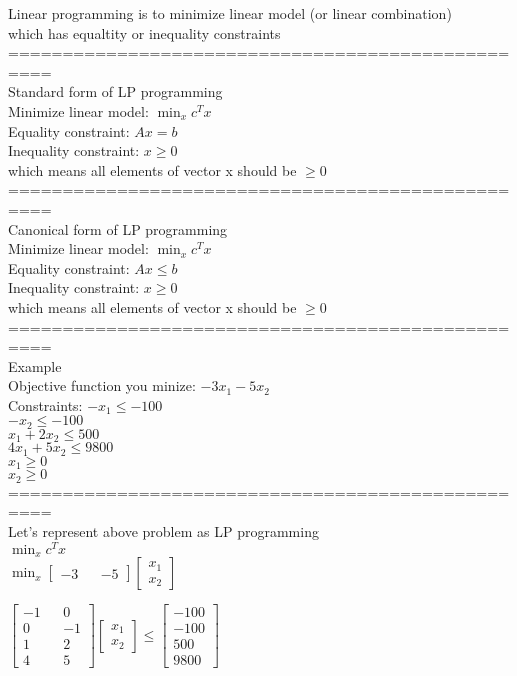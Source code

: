 \documentclass{article}
\begin{document}
Linear programming is to minimize linear model (or linear combination) \\
which has equaltity or inequality constraints \\

==================================================\\
Standard form of LP programming \\ 
Minimize linear model: $\min_x c^Tx$ \\ 
Equality constraint: $Ax=b$ \\ 
Inequality constraint: $x \ge 0$ \\ 
which means all elements of vector x should be $\ge 0$ \\ 

==================================================\\
Canonical form of LP programming \\ 
Minimize linear model: $\min_x c^Tx$ \\ 
Equality constraint: $Ax\le b$ \\ 
Inequality constraint: $x \ge 0$ \\ 
which means all elements of vector x should be $\ge 0$ \\ 

==================================================\\
Example \\ 
Objective function you minize: $-3x_1-5x_2$ \\ 
Constraints: 
$-x_1\le -100$ \\
$-x_2\le -100$ \\
$x_1+2x_2\le 500$ \\
$4x_1+5x_2\le 9800$ \\
$x_1\ge 0$ \\
$x_2\ge 0$ \\

==================================================\\
Let's represent above problem as LP programming \\ 

$\min_x c^Tx$ \\ 
$\min_x \begin{bmatrix}
-3 && -5
\end{bmatrix}
\begin{bmatrix}
x_1 \\ x_2
\end{bmatrix}$

$\begin{bmatrix}
-1 && 0 \\ 0 && -1 \\ 1 && 2 \\ 4 && 5
\end{bmatrix}
\begin{bmatrix}
x_1 \\ x_2
\end{bmatrix}
\le
\begin{bmatrix}
-100\\-100\\500\\9800
\end{bmatrix}$
\end{document}
